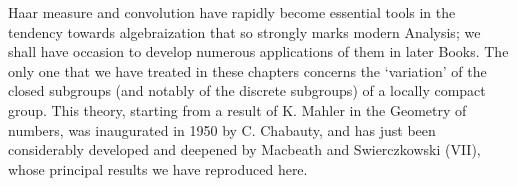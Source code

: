 Haar measure and convolution have rapidly become essential tools in the tendency towards algebraization that so strongly marks modern Analysis; we shall have occasion to develop numerous applications of them in later Books. The only one that we have treated in these chapters concerns the `variation' of the closed subgroups (and notably of the discrete subgroups) of a locally compact group. This theory, starting from a result of K. Mahler in the Geometry of numbers, was inaugurated in 1950 by C. Chabauty, and has just been considerably developed and deepened by Macbeath and Swierczkowski (VII), whose principal results we have reproduced here.

